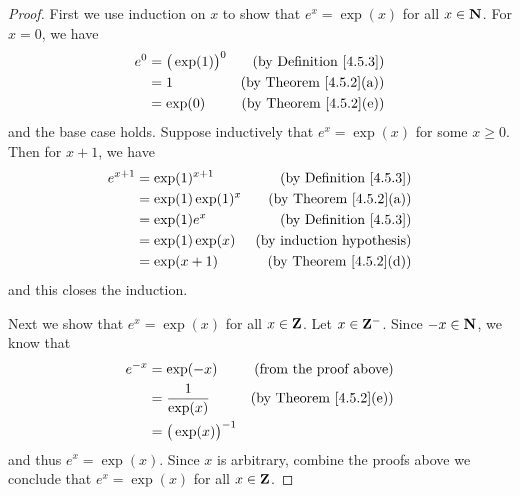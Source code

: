 \begin{proof}
    First we use induction on \(x\) to show that \(e^x = \exp(x)\) for all \(x \in \mathbf{N}\).
    For \(x = 0\), we have
    \begin{align*}
        e^0 & = \big(\exp(1)\big)^0 & \text{(by Definition \ref{4.5.3})} \\
            & = 1                   & \text{(by Theorem \ref{4.5.2}(a))} \\
            & = \exp(0)             & \text{(by Theorem \ref{4.5.2}(e))}
    \end{align*}
    and the base case holds.
    Suppose inductively that \(e^x = \exp(x)\) for some \(x \geq 0\).
    Then for \(x + 1\), we have
    \begin{align*}
        e^{x + 1} & = \exp(1)^{x + 1}   & \text{(by Definition \ref{4.5.3})} \\
                  & = \exp(1) \exp(1)^x & \text{(by Theorem \ref{4.5.2}(a))} \\
                  & = \exp(1) e^x       & \text{(by Definition \ref{4.5.3})} \\
                  & = \exp(1) \exp(x)   & \text{(by induction hypothesis)}   \\
                  & = \exp(x + 1)       & \text{(by Theorem \ref{4.5.2}(d))}
    \end{align*}
    and this closes the induction.

    Next we show that \(e^x = \exp(x)\) for all \(x \in \mathbf{Z}\).
    Let \(x \in \mathbf{Z}^-\).
    Since \(-x \in \mathbf{N}\), we know that
    \begin{align*}
        e^{-x} & = \exp(-x)               & \text{(from the proof above)}      \\
               & = \frac{1}{\exp(x)}      & \text{(by Theorem \ref{4.5.2}(e))} \\
               & = \big(\exp(x)\big)^{-1}
    \end{align*}
    and thus \(e^x = \exp(x)\).
    Since \(x\) is arbitrary, combine the proofs above we conclude that \(e^x = \exp(x)\) for all \(x \in \mathbf{Z}\).


\end{proof}
